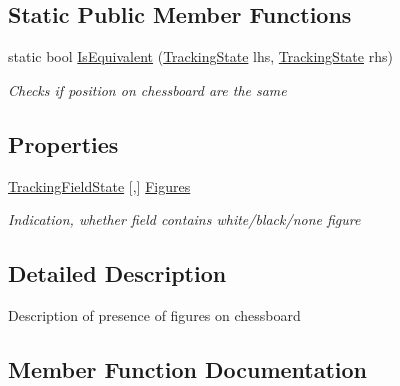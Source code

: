 \subsection*{Static Public Member Functions}
\begin{DoxyCompactItemize}
\item 
static bool \mbox{\hyperlink{class_chess_tracking_1_1_multithreading_messages_1_1_tracking_state_a27b9a526ddbbdfd93661e872b0be49c9}{Is\+Equivalent}} (\mbox{\hyperlink{class_chess_tracking_1_1_multithreading_messages_1_1_tracking_state}{Tracking\+State}} lhs, \mbox{\hyperlink{class_chess_tracking_1_1_multithreading_messages_1_1_tracking_state}{Tracking\+State}} rhs)
\begin{DoxyCompactList}\small\item\em Checks if position on chessboard are the same \end{DoxyCompactList}\end{DoxyCompactItemize}
\subsection*{Properties}
\begin{DoxyCompactItemize}
\item 
\mbox{\hyperlink{namespace_chess_tracking_1_1_multithreading_messages_ac10ea87452f4fb70b8c6abe5792fcb92}{Tracking\+Field\+State}} \mbox{[},\mbox{]} \mbox{\hyperlink{class_chess_tracking_1_1_multithreading_messages_1_1_tracking_state_ad671ca96c915b8c8a58393b0a024d9ea}{Figures}}
\begin{DoxyCompactList}\small\item\em Indication, whether field contains white/black/none figure \end{DoxyCompactList}\end{DoxyCompactItemize}


\subsection{Detailed Description}
Description of presence of figures on chessboard 



\subsection{Member Function Documentation}
\mbox{\label{class_chess_tracking_1_1_multithreading_messages_1_1_tracking_state_a27f5bd51ff124b6c3a641cd209fe811b}} 
